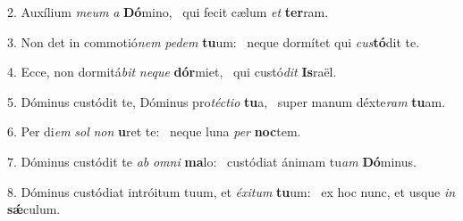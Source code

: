 2. Auxílium \textit{me}\textit{um} \textit{a} \textbf{Dó}mino, \ast\  qui fecit cælum \textit{et} \textbf{ter}ram.\

3. Non det in commotió\textit{nem} \textit{pe}\textit{dem} \textbf{tu}um: \ast\  neque dormítet qui \textit{cus}\textbf{tó}dit te.\

4. Ecce, non dormitá\textit{bit} \textit{ne}\textit{que} \textbf{dór}miet, \ast\  qui custó\textit{dit} \textbf{Is}raël.\

5. Dóminus custódit te, Dóminus pro\textit{téc}\textit{ti}\textit{o} \textbf{tu}a, \ast\  super manum déxte\textit{ram} \textbf{tu}am.\

6. Per di\textit{em} \textit{sol} \textit{non} \textbf{u}ret te: \ast\  neque luna \textit{per} \textbf{noc}tem.\

7. Dóminus custódit te \textit{ab} \textit{om}\textit{ni} \textbf{ma}lo: \ast\  custódiat ánimam tu\textit{am} \textbf{Dó}minus.\

8. Dóminus custódiat intróitum tuum, et \textit{éx}\textit{i}\textit{tum} \textbf{tu}um: \ast\  ex hoc nunc, et usque \textit{in} \textbf{sǽ}culum.\

